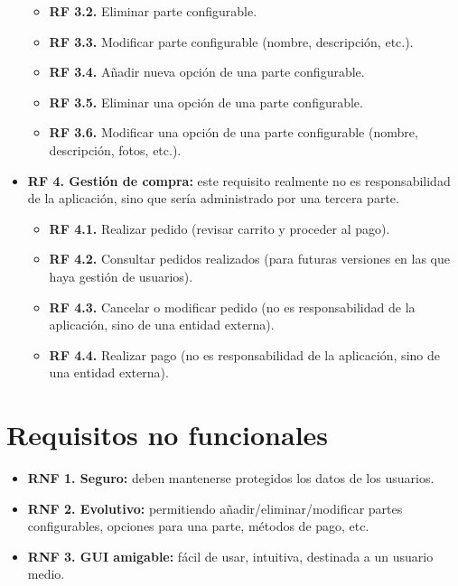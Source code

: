\begin{itemize}
\begin{itemize}
        \item \textbf{RF 3.2.} Eliminar parte configurable.
        \item \textbf{RF 3.3.} Modificar parte configurable (nombre, descripción, etc.).
        \item \textbf{RF 3.4.} Añadir nueva opción de una parte configurable.
        \item \textbf{RF 3.5.} Eliminar una opción de una parte configurable.
        \item \textbf{RF 3.6.} Modificar una opción de una parte configurable (nombre, descripción, fotos, etc.).
    \end{itemize}
    \item \textbf{RF 4. Gestión de compra:} este requisito realmente no es responsabilidad de la aplicación, sino que sería administrado por una tercera parte.
    \begin{itemize}
        \item \textbf{RF 4.1.} Realizar pedido (revisar carrito y proceder al pago).
        \item \textbf{RF 4.2.} Consultar pedidos realizados (para futuras versiones en las que haya gestión de usuarios).
        \item \textbf{RF 4.3.} Cancelar o modificar pedido (no es responsabilidad de la aplicación, sino de una entidad externa).
        \item \textbf{RF 4.4.} Realizar pago (no es responsabilidad de la aplicación, sino de una entidad externa).
    \end{itemize}
\end{itemize}


\section{Requisitos no funcionales}


\begin{itemize}
    \item \textbf{RNF 1. Seguro:} deben mantenerse protegidos los datos de los usuarios.
    \item \textbf{RNF 2. Evolutivo:} permitiendo añadir/eliminar/modificar partes configurables, opciones para una parte, métodos de pago, etc.
    \item \textbf{RNF 3. GUI amigable:} fácil de usar, intuitiva, destinada a un usuario medio.
\end{itemize}


